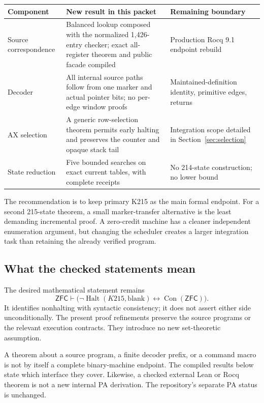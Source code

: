 \documentclass[11pt]{article}
\newcommand{\Con}{\operatorname{Con}}
\newcommand{\Halt}{\operatorname{Halt}}
\newcommand{\ZFC}{\mathsf{ZFC}}
\theoremstyle{remark}
\begin{document}
\begin{center}
\small
\begin{tabular}{p{34mm}p{65mm}p{38mm}}
\toprule
Component & New result in this packet & Remaining boundary\\
\midrule
Source correspondence &
Balanced lookup composed with the normalized 1,426-entry checker; exact
all-register theorem and public facade compiled &
Production Rocq 9.1 endpoint rebuild\\
\addlinespace
Decoder &
All internal source paths follow from one marker and actual pointer bits;
no per-edge window proofs &
Maintained-definition identity, primitive edges, returns\\
\addlinespace
AX selection &
A generic row-selection theorem permits early halting and preserves the
counter and opaque stack tail &
Integration scope detailed in Section~\ref{sec:selection}\\
\addlinespace
State reduction &
Five bounded searches on exact current tables, with complete receipts &
No 214-state construction; no lower bound\\
\bottomrule
\end{tabular}
\end{center}

The recommendation is to keep primary K215 as the main formal endpoint.
For a second 215-state theorem, a small marker-transfer alternative is the
least demanding incremental proof. A zero-credit machine has a cleaner
independent enumeration argument, but changing the scheduler creates a
larger integration task than retaining the already verified program.

\subsection{What the checked statements mean}

The desired mathematical statement remains
\[
\ZFC\vdash
\bigl(\neg\Halt(K215,\mathrm{blank})\leftrightarrow\Con(\ZFC)\bigr).
\]
It identifies nonhalting with syntactic consistency; it does not assert either
side unconditionally. The present proof refinements preserve the source
programs or the relevant execution contracts. They introduce no new
set-theoretic assumption.

A theorem about a source program, a finite decoder prefix, or a command
macro is not by itself a complete binary-machine endpoint. The compiled
results below state which interface they cover. Likewise, a checked external
Lean or Rocq theorem is not a new internal PA derivation. The repository's
separate PA status is unchanged.
\end{document}
